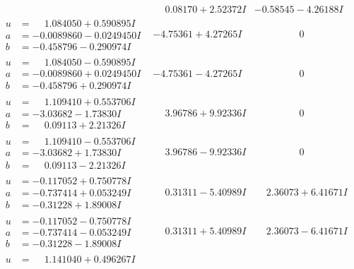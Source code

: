 \documentclass[1p]{elsarticle_modified}
\theoremstyle{definition}
\begin{document}
$$\begin{array}{c|c|c}
 & \phantom{-}0.08170 + 2.52372 I & -0.58545 - 4.26188 I \\ \hline\begin{aligned}
u &= \phantom{-}1.084050 + 0.590895 I \\
a &= -0.0089860 - 0.0249450 I \\
b &= -0.458796 - 0.290974 I\end{aligned}
 & -4.75361 + 4.27265 I & \phantom{-0.000000 } 0 \\ \hline\begin{aligned}
u &= \phantom{-}1.084050 - 0.590895 I \\
a &= -0.0089860 + 0.0249450 I \\
b &= -0.458796 + 0.290974 I\end{aligned}
 & -4.75361 - 4.27265 I & \phantom{-0.000000 } 0 \\ \hline\begin{aligned}
u &= \phantom{-}1.109410 + 0.553706 I \\
a &= -3.03682 - 1.73830 I \\
b &= \phantom{-}0.09113 + 2.21326 I\end{aligned}
 & \phantom{-}3.96786 + 9.92336 I & \phantom{-0.000000 } 0 \\ \hline\begin{aligned}
u &= \phantom{-}1.109410 - 0.553706 I \\
a &= -3.03682 + 1.73830 I \\
b &= \phantom{-}0.09113 - 2.21326 I\end{aligned}
 & \phantom{-}3.96786 - 9.92336 I & \phantom{-0.000000 } 0 \\ \hline\begin{aligned}
u &= -0.117052 + 0.750778 I \\
a &= -0.737414 + 0.053249 I \\
b &= -0.31228 + 1.89008 I\end{aligned}
 & \phantom{-}0.31311 - 5.40989 I & \phantom{-}2.36073 + 6.41671 I \\ \hline\begin{aligned}
u &= -0.117052 - 0.750778 I \\
a &= -0.737414 - 0.053249 I \\
b &= -0.31228 - 1.89008 I\end{aligned}
 & \phantom{-}0.31311 + 5.40989 I & \phantom{-}2.36073 - 6.41671 I \\ \hline\begin{aligned}
u &= \phantom{-}1.141040 + 0.496267 I \\

\end{aligned}
\end{array}$$
\end{document}
